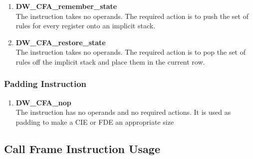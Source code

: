 \begin{enumerate}[1. ]

\item \textbf{DW\-\_CFA\-\_remember\-\_state} \\
The  instruction takes no operands. The
required action is to push the set of rules for every register
onto an implicit stack.

\item \textbf{DW\-\_CFA\-\_restore\-\_state} \\
The  instruction takes no operands. The
required action is to pop the set of rules off the implicit
stack and place them in the current row.

\end{enumerate}

\subsubsection{Padding Instruction}
\label{chap:paddinginstruction}
\begin{enumerate}[1. ]
\item \textbf{DW\-\_CFA\-\_nop} \\
The  instruction has no operands and no required
actions. It is used as padding to make a CIE or FDE an
appropriate size

\end{enumerate}

\subsection{Call Frame Instruction Usage} 
\label{chap:callframeinstructionusage}

